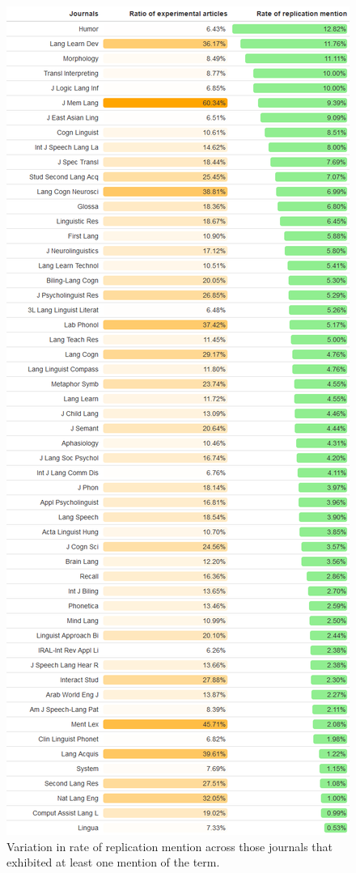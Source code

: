 \documentclass[]{elsarticle} %
\begin{document}
\begin{figure}

{\centering \includegraphics[height=1\textheight]{rep_mention} 

}

\caption{Variation in rate of replication mention across those journals that exhibited at least one mention of the term.}\label{fig:replication_mention}
\end{figure}
\end{document}
